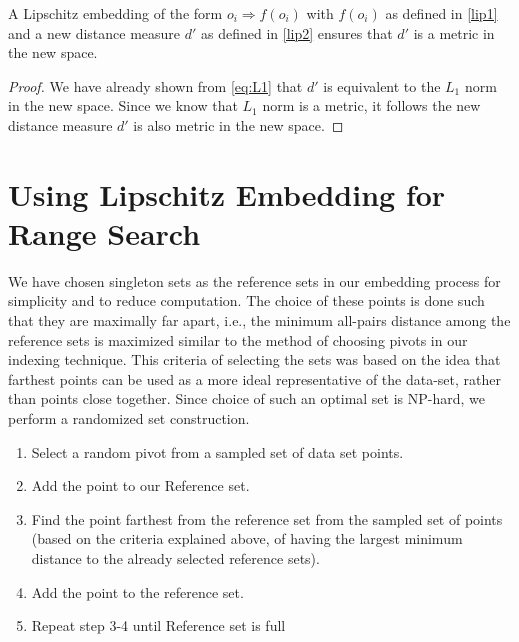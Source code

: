 \begin{thm}
A Lipschitz embedding of the form $o_i \Rightarrow f(o_i)$ with $f(o_i)$ as defined in \autoref{lip1} and a new distance measure $d'$ as defined in \autoref{lip2} ensures that $d'$ is a metric in the new space.
\end{thm}

\begin{proof}
We have already shown from \autoref{eq:L1} that $d'$ is equivalent to the $L_1$ norm in the new space. Since we know that $L_1$ norm is a metric, it follows the new distance measure $d'$ is also metric in the new space.
\end{proof}



\section{Using Lipschitz Embedding for Range Search }

We have chosen singleton sets as the reference sets in our embedding process for simplicity and to reduce computation. The choice of these points is done such that they are maximally far apart, i.e., the minimum all-pairs distance among the reference sets is maximized similar to the method of choosing pivots in our indexing technique. This criteria of selecting the sets was based on the idea that farthest points can be used as a more ideal representative of the data-set, rather than points close together. Since choice of such an optimal set is NP-hard, we perform a randomized set construction.\\

\begin{enumerate}
	\item Select a random pivot from a sampled set of  data set points.

	\item Add the point to our Reference set.

	\item Find the point farthest from the reference set from the sampled set of points (based on the criteria explained above, of having the largest minimum distance to the already selected reference sets).

	\item Add the point to the reference set.

	\item Repeat step 3-4 until Reference set is full\\
\end{enumerate}


